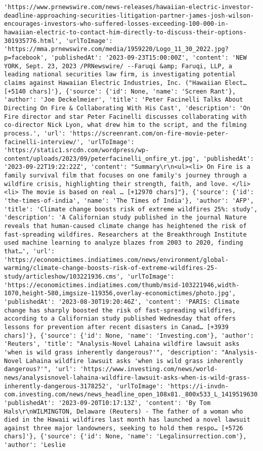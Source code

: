 \documentclass[
  letterpaper,
  DIV=11,
  numbers=noendperiod]{scrartcl}
\begin{document}
\begin{verbatim}
'https://www.prnewswire.com/news-releases/hawaiian-electric-investor-deadline-approaching-securities-litigation-partner-james-josh-wilson-encourages-investors-who-suffered-losses-exceeding-100-000-in-hawaiian-electric-to-contact-him-directly-to-discuss-their-options-301935776.html', 'urlToImage': 'https://mma.prnewswire.com/media/1959220/Logo_11_30_2022.jpg?p=facebook', 'publishedAt': '2023-09-23T15:00:00Z', 'content': 'NEW YORK, Sept. 23, 2023 /PRNewswire/ --Faruqi &amp; Faruqi, LLP, a leading national securities law firm, is investigating potential claims against Hawaiian Electric Industries, Inc. ("Hawaiian Elect… [+5140 chars]'}, {'source': {'id': None, 'name': 'Screen Rant'}, 'author': 'Joe Deckelmeier', 'title': 'Peter Facinelli Talks About Directing On Fire & Collaborating With His Cast', 'description': 'On Fire director and star Peter Facinelli discusses collaborating with co-director Nick Lyon, what drew him to the script, and the filming process.', 'url': 'https://screenrant.com/on-fire-movie-peter-facinelli-interview/', 'urlToImage': 'https://static1.srcdn.com/wordpress/wp-content/uploads/2023/09/peterfacinelli_onfire_yt.jpg', 'publishedAt': '2023-09-22T19:22:22Z', 'content': "Summary\r\n<ul><li> On Fire is a family survival film that focuses on one family's journey through a wildfire crisis, highlighting their strength, faith, and love. </li><li> The movie is based on real … [+12970 chars]"}, {'source': {'id': 'the-times-of-india', 'name': 'The Times of India'}, 'author': 'AFP', 'title': 'Climate change boosts risk of extreme wildfires 25%: study', 'description': 'A Californian study published in the journal Nature reveals that human-caused climate change has heightened the risk of fast-spreading wildfires. Researchers at the Breakthrough Institute used machine learning to analyze blazes from 2003 to 2020, finding that…', 'url': 'https://economictimes.indiatimes.com/news/environment/global-warming/climate-change-boosts-risk-of-extreme-wildfires-25-study/articleshow/103221936.cms', 'urlToImage': 'https://economictimes.indiatimes.com/thumb/msid-103221946,width-1070,height-580,imgsize-119356,overlay-economictimes/photo.jpg', 'publishedAt': '2023-08-30T19:20:46Z', 'content': 'PARIS: Climate change has sharply boosted the risk of fast-spreading wildfires, according to a Californian study published Wednesday that offers lessons for prevention after recent disasters in Canad… [+3939 chars]'}, {'source': {'id': None, 'name': 'Investing.com'}, 'author': 'Reuters', 'title': "Analysis-Novel Lahaina wildfire lawsuit asks 'when is wild grass inherently dangerous?'", 'description': "Analysis-Novel Lahaina wildfire lawsuit asks 'when is wild grass inherently dangerous?'", 'url': 'https://www.investing.com/news/world-news/analysisnovel-lahaina-wildfire-lawsuit-asks-when-is-wild-grass-inherently-dangerous-3178252', 'urlToImage': 'https://i-invdn-com.investing.com/news/news_headline_open_108x81._800x533_L_1419519630.jpg', 'publishedAt': '2023-09-20T10:17:13Z', 'content': 'By Tom Hals\r\nWILMINGTON, Delaware (Reuters) - The father of a woman who died in the Hawaii wildfires last month has launched a novel lawsuit against three major landowners, seeking to hold them respo… [+5726 chars]'}, {'source': {'id': None, 'name': 'Legalinsurrection.com'}, 'author': 'Leslie 
\end{verbatim}
\end{document}
